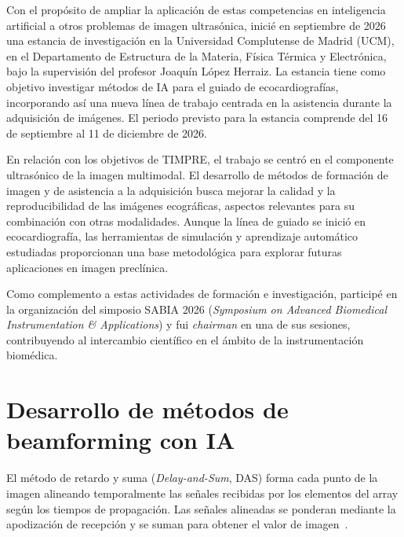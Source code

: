 \documentclass[10pt,a4paper]{article}
\begin{document}
Con el propósito de ampliar la aplicación de estas competencias en inteligencia artificial a otros problemas de imagen ultrasónica, inicié en septiembre de 2026 una estancia de investigación en la Universidad Complutense de Madrid (UCM), en el Departamento de Estructura de la Materia, Física Térmica y Electrónica, bajo la supervisión del profesor Joaquín López Herraiz. La estancia tiene como objetivo investigar métodos de IA para el guiado de ecocardiografías, incorporando así una nueva línea de trabajo centrada en la asistencia durante la adquisición de imágenes. El periodo previsto para la estancia comprende del 16 de septiembre al 11 de diciembre de 2026.

En relación con los objetivos de TIMPRE, el trabajo se centró en el componente ultrasónico de la imagen multimodal. El desarrollo de métodos de formación de imagen y de asistencia a la adquisición busca mejorar la calidad y la reproducibilidad de las imágenes ecográficas, aspectos relevantes para su combinación con otras modalidades. Aunque la línea de guiado se inició en ecocardiografía, las herramientas de simulación y aprendizaje automático estudiadas proporcionan una base metodológica para explorar futuras aplicaciones en imagen preclínica.

Como complemento a estas actividades de formación e investigación, participé en la organización del simposio SABIA 2026 (\textit{Symposium on Advanced Biomedical Instrumentation \& Applications}) y fui \textit{chairman} en una de sus sesiones, contribuyendo al intercambio científico en el ámbito de la instrumentación biomédica.


\section{Desarrollo de métodos de beamforming con IA}\label{sec:beamforming}

El método de retardo y suma (\textit{Delay-and-Sum}, DAS) forma cada punto de la imagen alineando temporalmente las señales recibidas por los elementos del array según los tiempos de propagación. Las señales alineadas se ponderan mediante la apodización de recepción y se suman para obtener el valor de imagen~\cite{Perrot2021}.
\end{document}
